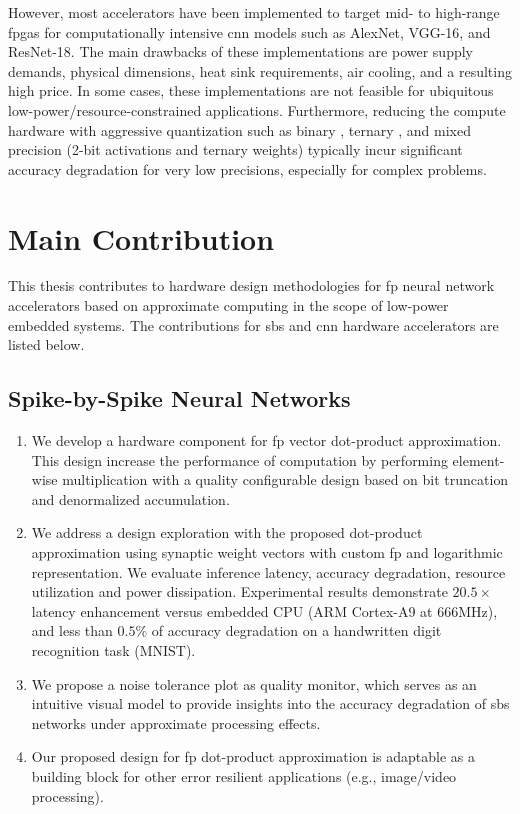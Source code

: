 However, most accelerators have been implemented to target mid- to high-range \gls{fpga}s for computationally intensive \gls{cnn} models such as AlexNet, VGG-16, and ResNet-18. The main drawbacks of these implementations are power supply demands, physical dimensions, heat sink requirements, air cooling, and a resulting high price. In some cases, these implementations are not feasible for ubiquitous low-power/resource-constrained applications. Furthermore, reducing the compute hardware with aggressive quantization such as binary \cite{courbariaux2015binaryconnect}, ternary \cite{lin2015neural}, and mixed precision (2-bit activations and ternary weights) \cite{colangelo2018exploration} typically incur significant accuracy degradation for very low precisions, especially for complex problems\cite{faraone2019addnet}.

\section{Main Contribution}
This thesis contributes to hardware design methodologies for \gls{fp} neural network accelerators based on approximate computing in the scope of low-power embedded systems. The contributions for \gls{sbs} and \gls{cnn} hardware accelerators are listed below.

\subsection{Spike-by-Spike Neural Networks}
\begin{enumerate}
	\item We develop a hardware component for \gls{fp} vector dot-product approximation. This design increase the performance of computation by performing element-wise multiplication with a quality configurable design based on bit truncation and denormalized accumulation.
	\item We address a design exploration with the proposed dot-product approximation using synaptic weight vectors with custom \gls{fp} and logarithmic representation. We evaluate inference latency, accuracy degradation, resource utilization and power dissipation. Experimental results demonstrate $20.5\times$ latency enhancement versus embedded CPU (ARM Cortex-A9 at $666$MHz), and less than $0.5\%$ of accuracy degradation on a handwritten digit recognition task (MNIST).
	\item We propose a noise tolerance plot as quality monitor, which serves as an intuitive visual model to provide insights into the accuracy degradation of \gls{sbs} networks under approximate processing effects.
	\item Our proposed design for \gls{fp} dot-product approximation is adaptable as a building block for other error resilient applications (e.g., image/video processing).
\end{enumerate}


